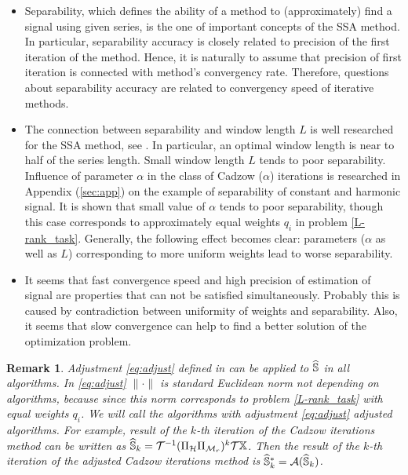 \documentclass[sii]{ipart}
\newtheorem{remark}{Remark}
\begin{document}
\begin{itemize}
		\item
		Separability, which defines the ability of a method to (approximately) find a signal using given series, is the one of important concepts of the SSA method. In particular, separability accuracy is closely related to precision of the first iteration of the method. Hence, it is naturally to assume that precision of first iteration is connected with method's convergency rate. Therefore, questions about separability accuracy are related to convergency speed of iterative methods.
		\item
		The connection between separability and window length $L$ is well researched for the SSA method, see \cite{Golyandina2010}. In particular, an optimal window length is near to half of the series length. Small window length $L$ tends to poor separability. Influence of parameter $\alpha$ in the class of Cadzow ($\alpha$) iterations is researched in Appendix (\ref{sec:app}) on the example of separability of constant and harmonic signal. It is shown that small value of $\alpha$ tends to poor separability, though this case corresponds to approximately equal weights $q_i$ in problem \eqref{L-rank_task}. Generally, the following effect becomes clear: parameters ($\alpha$ as well as $L$) corresponding to more uniform weights lead to worse separability.
		\item
		It seems that fast convergence speed and high precision of estimation of signal are properties that can not be satisfied simultaneously. Probably this is caused by contradiction between uniformity of weights and separability. Also, it seems that slow convergence can help to find a better solution of the optimization problem.
	\end{itemize}
	
	\begin{remark}
		\label{rem:adjust}
		Adjustment \eqref{eq:adjust} defined in can be applied to $\widehat{\mathbb{S}}$ in all algorithms. In \eqref{eq:adjust} $\|\cdot\|$ is standard Euclidean norm not depending on algorithms, because since this norm corresponds to problem \eqref{L-rank_task} with equal weights $q_i$. We will call the algorithms with adjustment \eqref{eq:adjust} adjusted algorithms. For example, result of the $k$-th iteration of the Cadzow iterations method can be written as $\widehat{\mathbb{S}}_k = \mathcal{T}^{-1}(\Pi_{\mathcal{H}} \Pi_{\mathcal{M}_r})^k \mathcal{T} \mathbb{X}$. Then the result of the $k$-th iteration of the adjusted Cadzow iterations method is $\widehat{\mathbb{S}}_k^*=\mathcal{A}(\widehat{\mathbb{S}}_k)$.
	\end{remark}
\end{document}
